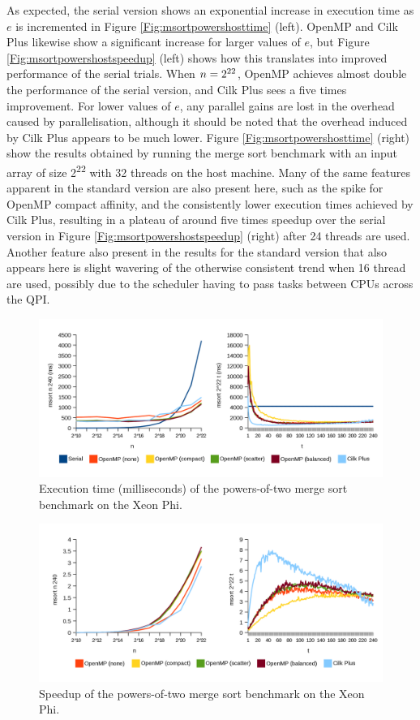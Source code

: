 \documentclass{report}
\begin{document}
As expected, the serial version shows an exponential increase in execution time as \(e\) is incremented in Figure \ref{Fig:msortpowershosttime} (left). OpenMP and Cilk Plus likewise show a significant increase for larger values of \(e\), but Figure \ref{Fig:msortpowershostspeedup} (left) shows how this translates into improved performance of the serial trials. When \(n=2\textsuperscript{22}\), OpenMP achieves almost double the performance of the serial version, and Cilk Plus sees a five times improvement. For lower values of \(e\), any parallel gains are lost in the overhead caused by parallelisation, although it should be noted that the overhead induced by Cilk Plus appears to be much lower. Figure \ref{Fig:msortpowershosttime} (right) show the results obtained by running the merge sort benchmark with an input array of size 2\textsuperscript{22} with 32 threads on the host machine. Many of the same features apparent in the standard version are also present here, such as the spike for OpenMP compact affinity, and the consistently lower execution times achieved by Cilk Plus, resulting in a plateau of around five times speedup over the serial version in Figure \ref{Fig:msortpowershostspeedup} (right) after 24 threads are used. Another feature also present in the results for the standard version that also appears here is slight wavering of the otherwise consistent trend when 16 thread are used, possibly due to the scheduler having to pass tasks between CPUs across the QPI.
\noindent
\begin{figure}[t!]
	\includegraphics[width=\linewidth]{../../charts/mic/msort_powers_time}
	\caption{Execution time (milliseconds) of the powers-of-two merge sort benchmark on the Xeon Phi.}
	\label{Fig:msortpowersmictime}
\end{figure}
\noindent
\begin{figure}[t!]
	\includegraphics[width=\linewidth]{../../charts/mic/msort_powers_speedup}
	\caption{Speedup of the powers-of-two merge sort benchmark on the Xeon Phi.}
	\label{Fig:msortpowersmicspeedup}
\end{figure}
\end{document}

